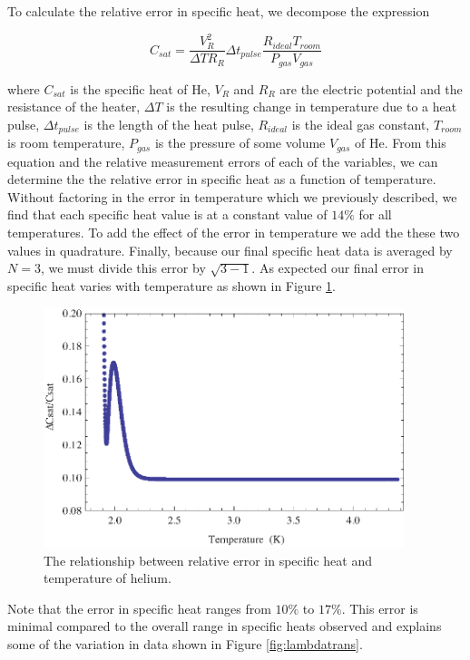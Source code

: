 To calculate the relative error in specific heat, we decompose the expression 

\begin{center}
\begin{equation}
C_{sat}=\frac{V_{R}^{2}}{\Delta T R_{R}}\Delta t_{pulse} \frac{R_{ideal}T_{room}}{P_{gas}V_{gas}}
\end{equation}
\end{center}

where $C_{sat}$ is the specific heat of He, $V_{R}$ and $R_{R}$ are the electric potential and the resistance of the heater, $\Delta T$ is the resulting change in temperature due to a heat pulse, $\Delta t_{pulse}$ is the length of the heat pulse, $R_{ideal}$ is the ideal gas constant, $T_{room}$ is room temperature, $P_{gas}$ is the pressure of some volume $V_{gas}$ of He.  From this equation and the relative measurement errors of each of the variables, we can determine the the relative error in specific heat as a function of temperature.  Without factoring in the error in temperature which we previously described, we find that each specific heat value is at a constant value of $14\%$ for all temperatures.  To add the effect of the error in temperature we add the these two values in quadrature.  Finally, because our final specific heat data is averaged by $N=3$, we must divide this error by $\sqrt{3-1}$. As expected our final error in specific heat varies with temperature as shown in Figure \ref{fig:heatcaperror}.

\begin{figure}[htbp]
\begin{center}
\includegraphics[height=70mm]{./figures/heatcaperror.eps}
\caption{\small{The relationship between relative error in specific heat and temperature of helium.}}
\label{fig:heatcaperror}
\end{center}
\end{figure}

Note that the error in specific heat ranges from $10\%$ to $17\%$.  This error is minimal compared to the overall range in specific heats observed and explains some of the variation in data shown in Figure \ref{fig:lambdatrans}.